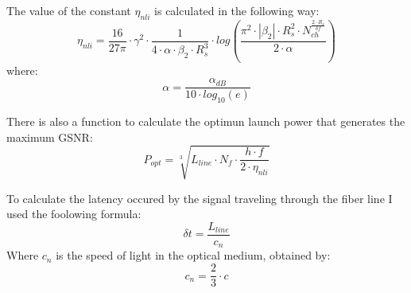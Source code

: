 \documentclass{beamer}
\begin{document}
	\begin{frame}
		The value of the constant $\eta_{nli}$ is calculated in the following way:
		\begin{equation}
			\eta_{nli} = \frac{16}{27\pi} \cdot \gamma^2 \cdot \frac{1}{4 \cdot \alpha \cdot \beta_2 \cdot R_s^3} \cdot log\left(\frac{\pi^2 \cdot \left|\beta_2\right| \cdot R_s^2 \cdot N_{ch}^{\frac{2 \cdot R_s}{\delta f}}}{2 \cdot \alpha}\right)
			\label{eq:eta_nli}
		\end{equation}
		where:
		\begin{equation}
			\alpha = \frac{\alpha_{dB}}{10 \cdot log_{10}\left(e\right)}
			\label{eq:alpha}
		\end{equation}
	\end{frame}
	\begin{frame}
		There is also a function to calculate the optimun launch power that generates the maximum GSNR:
		\begin{equation} %
			P_{opt} = \sqrt[3]{ L_{line} \cdot N_f \cdot \frac{h\cdot f}{2 \cdot \eta_{nli}}}
		\end{equation}
	\end{frame}
	\begin{frame}
		To calculate the latency occured by the signal traveling through the fiber line I used the foolowing formula:
		\begin{equation}
			\delta t = \frac{L_{line}}{c_{n}}
		\end{equation}
		Where $c_n$ is the speed of light in the optical medium, obtained by:
		\begin{equation}
			c_n = \frac{2}{3} \cdot c
		\end{equation}
	\end{frame}
\end{document}
